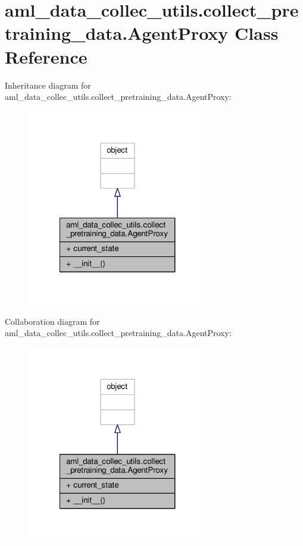 \hypertarget{classaml__data__collec__utils_1_1collect__pretraining__data_1_1_agent_proxy}{\section{aml\-\_\-data\-\_\-collec\-\_\-utils.\-collect\-\_\-pretraining\-\_\-data.\-Agent\-Proxy Class Reference}
\label{classaml__data__collec__utils_1_1collect__pretraining__data_1_1_agent_proxy}
}


Inheritance diagram for aml\-\_\-data\-\_\-collec\-\_\-utils.\-collect\-\_\-pretraining\-\_\-data.\-Agent\-Proxy\-:
\nopagebreak
\begin{figure}[H]
\begin{center}
\leavevmode
\includegraphics[width=224pt]{classaml__data__collec__utils_1_1collect__pretraining__data_1_1_agent_proxy__inherit__graph}
\end{center}
\end{figure}


Collaboration diagram for aml\-\_\-data\-\_\-collec\-\_\-utils.\-collect\-\_\-pretraining\-\_\-data.\-Agent\-Proxy\-:
\nopagebreak
\begin{figure}[H]
\begin{center}
\leavevmode
\includegraphics[width=224pt]{classaml__data__collec__utils_1_1collect__pretraining__data_1_1_agent_proxy__coll__graph}
\end{center}
\end{figure}
